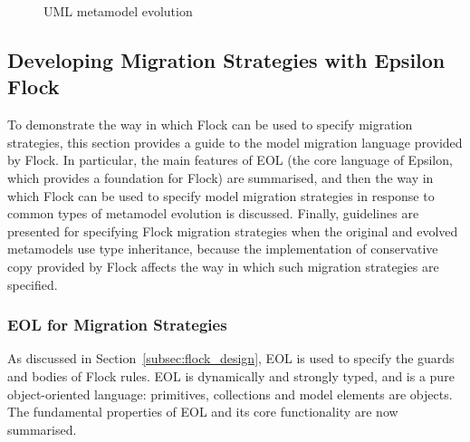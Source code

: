 \begin{landscape}	
\begin{figure}[ht]
	\centering
	\caption{UML metamodel evolution}
\label{fig:uml_mms}
\end{figure}
\end{landscape}	


\subsection{Developing Migration Strategies with Epsilon Flock}
\label{subsec:flock_guide}
To  demonstrate the way in which Flock can be used to specify migration strategies, this section provides a guide to the model migration language provided by Flock. In particular, the main features of EOL (the core language of Epsilon, which provides a foundation for Flock) are summarised, and then the way in which Flock can be used to specify model migration strategies in response to common types of metamodel evolution is discussed. Finally, guidelines are presented for specifying Flock migration strategies when the original and evolved metamodels use type inheritance, because the implementation of conservative copy provided by Flock affects the way in which such migration strategies are specified.

\subsubsection{EOL for Migration Strategies}
As discussed in Section~\ref{subsec:flock_design}, EOL is used to specify the guards and bodies of Flock rules. EOL is dynamically and strongly typed, and is a pure object-oriented language: primitives, collections and model elements are objects. The fundamental properties of EOL and its core functionality are now summarised.

